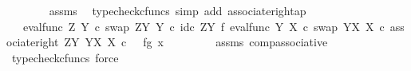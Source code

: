 \begin{isabellebody}
\ \ \ \ \ \ \isamarkupfalse%
\ assms\ \isamarkupfalse%
\ {\isacharparenleft}{\kern0pt}typecheck{\isacharunderscore}{\kern0pt}cfuncs{\isacharcomma}{\kern0pt}\ simp\ add{\isacharcolon}{\kern0pt}\ associate{\isacharunderscore}{\kern0pt}right{\isacharunderscore}{\kern0pt}ap{\isacharparenright}{\kern0pt}\isanewline
\ \ \ \ \isamarkupfalse%
\ \isamarkupfalse%
\ {\isachardoublequoteopen}{\isachardot}{\kern0pt}{\isachardot}{\kern0pt}{\isachardot}{\kern0pt}\ {\isacharequal}{\kern0pt}\ {\isacharparenleft}{\kern0pt}eval{\isacharunderscore}{\kern0pt}func\ Z\ Y\ {\isasymcirc}\isactrlsub c\ swap\ {\isacharparenleft}{\kern0pt}Z\isactrlbsup Y\isactrlesup {\isacharparenright}{\kern0pt}\ Y\ {\isasymcirc}\isactrlsub c\ {\isacharparenleft}{\kern0pt}id\isactrlsub c\ {\isacharparenleft}{\kern0pt}Z\isactrlbsup Y\isactrlesup {\isacharparenright}{\kern0pt}\ {\isasymtimes}\isactrlsub f\ eval{\isacharunderscore}{\kern0pt}func\ Y\ X\ {\isasymcirc}\isactrlsub c\ swap\ {\isacharparenleft}{\kern0pt}Y\isactrlbsup X\isactrlesup {\isacharparenright}{\kern0pt}\ X{\isacharparenright}{\kern0pt}\ {\isasymcirc}\isactrlsub c\ associate{\isacharunderscore}{\kern0pt}right\ {\isacharparenleft}{\kern0pt}Z\isactrlbsup Y\isactrlesup {\isacharparenright}{\kern0pt}\ {\isacharparenleft}{\kern0pt}Y\isactrlbsup X\isactrlesup {\isacharparenright}{\kern0pt}\ X{\isacharparenright}{\kern0pt}\ {\isasymcirc}\isactrlsub c\ \ \ {\isasymlangle}{\isasymlangle}f{\isacharcomma}{\kern0pt}g{\isasymrangle}{\isacharcomma}{\kern0pt}\ x\ {\isasymrangle}{\isachardoublequoteclose}\isanewline
\ \ \ \ \ \ \isamarkupfalse%
\ assms\ comp{\isacharunderscore}{\kern0pt}associative{}\ \isamarkupfalse%
\ {\isacharparenleft}{\kern0pt}typecheck{\isacharunderscore}{\kern0pt}cfuncs{\isacharcomma}{\kern0pt}\ force{\isacharparenright}{\kern0pt}\isanewline
\ \ \ \ \isamarkupfalse%
\ \isamarkupfalse%

\end{isabellebody}
